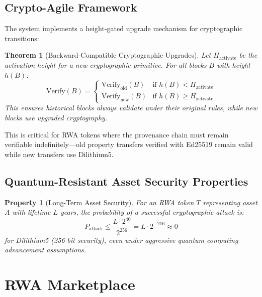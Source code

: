 \documentclass[11pt,a4paper,twoside]{article}
\newtheorem{theorem}{Theorem}[section]
\newtheorem{property}{Property}[section]
\begin{document}
\subsection{Crypto-Agile Framework}

The system implements a height-gated upgrade mechanism for cryptographic transitions:

\begin{theorem}[Backward-Compatible Cryptographic Upgrades]
Let $H_{\text{activate}}$ be the activation height for a new cryptographic primitive. For all blocks $B$ with height $h(B)$:
\begin{equation}
\text{Verify}(B) =
\begin{cases}
\text{Verify}_{\text{old}}(B) & \text{if } h(B) < H_{\text{activate}} \\
\text{Verify}_{\text{new}}(B) & \text{if } h(B) \geq H_{\text{activate}}
\end{cases}
\end{equation}
This ensures historical blocks always validate under their original rules, while new blocks use upgraded cryptography.
\end{theorem}

This is critical for RWA tokens where the provenance chain must remain verifiable indefinitely---old property transfers verified with Ed25519 remain valid while new transfers use Dilithium5.

\subsection{Quantum-Resistant Asset Security Properties}

\begin{property}[Long-Term Asset Security]
For an RWA token $T$ representing asset $A$ with lifetime $L$ years, the probability of a successful cryptographic attack is:
\begin{equation}
P_{\text{attack}} \leq \frac{L \cdot 2^{40}}{2^{256}} = L \cdot 2^{-216} \approx 0
\end{equation}
for Dilithium5 (256-bit security), even under aggressive quantum computing advancement assumptions.
\end{property}

\section{RWA Marketplace}
\label{sec:marketplace}
\end{document}
